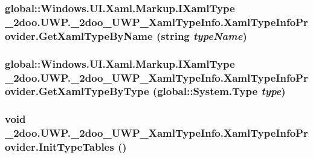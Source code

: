 \hypertarget{class__2doo_1_1_u_w_p_1_1__2doo___u_w_p___xaml_type_info_1_1_xaml_type_info_provider_a05f2d0d33fc91b799b9c4f257765f28}{
\subsubsection[{GetXamlTypeByName}]{\setlength{\rightskip}{0pt plus 5cm}global::Windows.UI.Xaml.Markup.IXamlType \_\-2doo.UWP.\_\-2doo\_\-UWP\_\-XamlTypeInfo.XamlTypeInfoProvider.GetXamlTypeByName (string {\em typeName})}}
\label{class__2doo_1_1_u_w_p_1_1__2doo___u_w_p___xaml_type_info_1_1_xaml_type_info_provider_a05f2d0d33fc91b799b9c4f257765f28}


\hypertarget{class__2doo_1_1_u_w_p_1_1__2doo___u_w_p___xaml_type_info_1_1_xaml_type_info_provider_b6669cae2613d48afbd020b2e9876a95}{
\subsubsection[{GetXamlTypeByType}]{\setlength{\rightskip}{0pt plus 5cm}global::Windows.UI.Xaml.Markup.IXamlType \_\-2doo.UWP.\_\-2doo\_\-UWP\_\-XamlTypeInfo.XamlTypeInfoProvider.GetXamlTypeByType (global::System.Type {\em type})}}
\label{class__2doo_1_1_u_w_p_1_1__2doo___u_w_p___xaml_type_info_1_1_xaml_type_info_provider_b6669cae2613d48afbd020b2e9876a95}


\hypertarget{class__2doo_1_1_u_w_p_1_1__2doo___u_w_p___xaml_type_info_1_1_xaml_type_info_provider_c73716b00fa88a12511d02e8aa25c234}{
\subsubsection[{InitTypeTables}]{\setlength{\rightskip}{0pt plus 5cm}void \_\-2doo.UWP.\_\-2doo\_\-UWP\_\-XamlTypeInfo.XamlTypeInfoProvider.InitTypeTables ()}}
\label{class__2doo_1_1_u_w_p_1_1__2doo___u_w_p___xaml_type_info_1_1_xaml_type_info_provider_c73716b00fa88a12511d02e8aa25c234}


